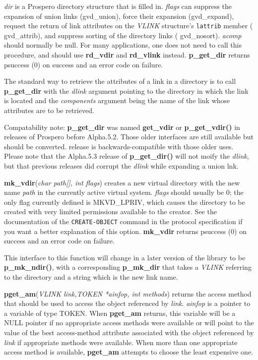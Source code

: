 {\it dir} is a Prospero directory structure that is filled in.  {\it
flags} can suppress the expansion of union links ({\sc gvd\_union}),
force their expansion ({\sc gvd\_expand}), request the return of link
attributes on the {\it VLINK} structure's {\tt lattrib} member ({\sc
gvd\_attrib}), and suppress sorting of the directory links ({\sc
gvd\_nosort}).  {\it acomp} should normally be {\sc null}.  For many
applications, one does not need to call this procedure, and should use
{\bf rd\_vdir} and {\bf rd\_vlink} instead.  {\bf p\_get\_dir} returns
{\sc psuccess} (0) on success and an error code on failure.

The standard way to retrieve the attributes of a link in a directory
is to call {\bf p\_get\_dir} with the {\it dlink} argument pointing
to the directory in which the link is located and the {\it components}
argument being the name of the link whose attributes are to be
retrieved.  

Compatability note: {\bf p\_get\_dir} was named {\bf get\_vdir} or
{\bf p\_get\_vdir()} in releases of Prospero before Alpha.5.2.  Those
older interfaces are still available but should be converted.
release is backwards-compatible with those older uses.
Please note that the Alpha.5.3 release of {\bf p\_get\_dir()} will not
moify the {\it dlink}, but that previous releases did corrupt the {\it
dlink} while expanding a union lnk.

{\bf mk\_vdir}({\it char path[], int flags}) creates a new virtual
directory with 
the new name {\it path} in the currently active virtual system.  {\it
flags} should usually be 0; the only flag currently defined is {\sc
MKVD\_LPRIV}, which causes the directory to be created with very
limited permissions available to the creator.  See the documentation
of the {\tt CREATE-OBJECT} command in the protocol specification if
you want a better explanation of this option.
{\bf mk\_vdir} returns {\sc psuccess} (0) on success and an error code
on failure. 

This interface to this function will change in a later version of the
library to be {\bf p\_mk\_ndir()}, with a corresponding {\bf p\_mk\_dir}
that takes a {\it VLINK} referring to the directory and a string which
is the new link name.

{\bf pget\_am}({\it VLINK link,TOKEN *ainfop, int methods}) returns
the access method that should be used to access the object referenced
by {\it link}.  {\it *ainfop} is a pointer to a variable of type
TOKEN.  When {\bf pget\_am} returns, this variable will be a NULL
pointer if no appropriate access methods were available or will point
to the value of the best {\sc access-method} attribute associated with
the object referenced by {\it link} if appropriate methods were
available.  When more than one appropriate access method is available,
{\bf pget\_am} attempts to choose the least expensive one.  

